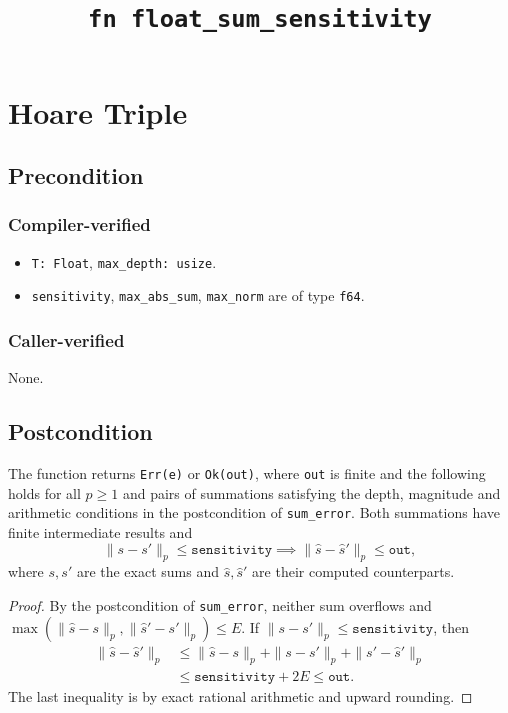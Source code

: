 \documentclass{article}
\title{\texttt{fn float\_sum\_sensitivity}}
\author{\MichaelShoemateAuthor}
\begin{document}
\maketitle
\contrib

\section{Hoare Triple}
\subsection*{Precondition}
\subsubsection*{Compiler-verified}
\begin{itemize}
    \item \texttt{T: Float}, \texttt{max\_depth: usize}.
    \item \texttt{sensitivity}, \texttt{max\_abs\_sum}, \texttt{max\_norm} are of type \texttt{f64}.
\end{itemize}

\subsubsection*{Caller-verified}
None.

\subsection*{Postcondition}
\begin{theorem}
    The function returns \texttt{Err(e)} or \texttt{Ok(out)}, where
    \texttt{out} is finite and the following holds for all $p\ge1$
    and pairs of summations satisfying the depth, magnitude and
    arithmetic conditions in the postcondition of \texttt{sum\_error}.
    Both summations have finite intermediate results and
    \[
        \|s-s'\|_p\le\texttt{sensitivity}
        \implies \|\widehat{s}-\widehat{s}'\|_p\le\texttt{out},
    \]
    where $s,s'$ are the exact sums and $\widehat{s},\widehat{s}'$ are
    their computed counterparts.
\end{theorem}

\begin{proof}
    By the postcondition of \texttt{sum\_error}, neither sum overflows and
    $\max(\|\widehat{s}-s\|_p,\|\widehat{s}'-s'\|_p)\le E$.
    If $\|s-s'\|_p\le\texttt{sensitivity}$, then
    \begin{align*}
        \|\widehat{s}-\widehat{s}'\|_p
        &\le\|\widehat{s}-s\|_p+\|s-s'\|_p+\|s'-\widehat{s}'\|_p\\
        &\le\texttt{sensitivity}+2E
        \le\texttt{out}.
    \end{align*}
    The last inequality is by exact rational arithmetic and upward rounding.
\end{proof}
\end{document}
